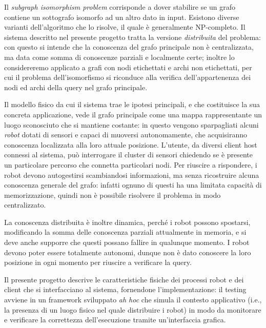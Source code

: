 Il \emph{subgraph isomorphism problem} corrisponde a dover
stabilire se un grafo contiene un sottografo isomorfo ad
un altro dato in input.
Esistono diverse varianti dell'algoritmo che lo risolve, il quale è
generalmente NP-completo.
Il sistema descritto nel presente progetto
tratta la versione \emph{distribuita} del problema:
con questo si intende che la conoscenza del grafo principale non
è centralizzata, ma data come somma di conoscenze parziali e
localmente certe; inoltre lo considereremo applicato
a grafi con nodi etichettati e archi non etichettati,
per cui il problema dell'isomorfismo si riconduce alla verifica
dell'appartenenza dei nodi ed archi della query nel grafo principale.

Il modello fisico da cui il sistema trae le ipotesi principali,
e che costituisce la sua concreta applicazione, vede il grafo
principale come una mappa rappresentante un luogo sconosciuto
che si mantiene costante:
in questo vengono sparpagliati alcuni \emph{robot}
dotati di sensori e capaci di muoversi autonomamente, che acquisiranno
conoscenza localizzata alla loro attuale posizione.
L'utente, da diversi client host connessi al sistema, può
interrogare il cluster di sensori chiedendo se è
presente un particolare percorso che connetta particolari nodi.
Per riuscire a rispondere, i robot devono autogestirsi scambiandosi
informazioni, ma senza ricostruire alcuna conoscenza generale del grafo:
infatti ognuno di questi ha una limitata capacità di memorizzazione,
quindi non è possibile risolvere il problema in modo centralizzato.

La conoscenza distribuita è inoltre dinamica, perché i robot
possono spostarsi, modificando la somma delle conoscenza parziali
attualmente in memoria, e si deve anche supporre che questi possano
fallire in qualunque momento.
I robot devono poter essere totalmente autonomi, dunque non
è dato conoscere la loro posizione in ogni momento per
riuscire a verificare la query.

Il presente progetto descrive le caratteristiche fisiche dei
processi robot e dei client che si interfacciano al sistema,
fornendone l'implementazione: il testing
avviene in un framework sviluppato \emph{ah hoc}
che simula il contesto applicativo (i.e., la presenza di un luogo
fisico nel quale distribuire i robot)
in modo da monitorare e verificare la correttezza dell'esecuzione
tramite un'interfaccia grafica.
